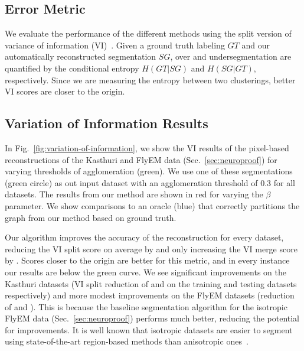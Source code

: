 
\subsection{Error Metric}
\label{sec:variation-of-information}

We evaluate the performance of the different methods using the split version of variance of information (VI)~\cite{meila2003comparing}.
Given a ground truth labeling $GT$ and our automatically reconstructed segmentation $SG$, over and undersegmentation are quantified by the conditional entropy $H(GT | SG)$ and $H(SG | GT)$, respectively. Since we are measuring the entropy between two clusterings, better VI scores are closer to the origin.

\subsection{Variation of Information Results}

In Fig.~\ref{fig:variation-of-information}, we show the VI results of the pixel-based reconstructions of the Kasthuri and FlyEM data (Sec.~\ref{sec:neuroproof}) for varying thresholds of agglomeration (green). We use one of these segmentations (green circle) as out input dataset with an agglomeration threshold of 0.3 for all datasets. The results from our method are shown in red for varying the $\beta$ parameter. We show comparisons to an oracle (blue) that correctly partitions the graph from our method based on ground truth.

Our algorithm improves the accuracy of the reconstruction for every dataset, reducing the VI split score on average by  and only increasing the VI merge score by .
Scores closer to the origin are better for this metric, and in every instance our results are below the green curve.
We see significant improvements on the Kasthuri datasets (VI split reduction of  and  on the training and testing datasets respectively) and more modest improvements on the FlyEM datasets (reduction of  and ). This is because the baseline segmentation algorithm for the isotropic FlyEM data (Sec.~\ref{sec:neuroproof}) performs much better, reducing the potential for improvements. It is well known that isotropic datasets are easier to segment using state-of-the-art region-based methods than anisotropic ones~\cite{plaza2014annotating}.

